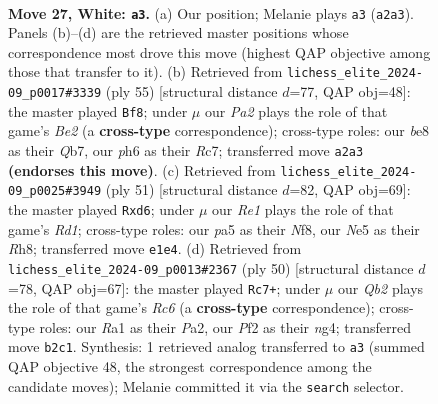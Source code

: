 \documentclass[11pt]{article}
\begin{document}
\clearpage

\begin{figure}[p]\centering
\begin{subfigure}{0.46\textwidth}\centering
\resizebox{\linewidth}{!}{%
\newchessgame
\chessboard[
  setfen={r2qb1k1/p4pp1/7p/p2pN1P1/1r2n2P/1P1B4/PQ3P2/R3R1K1 w - - 1 27},
  showmover=false,
  pgfstyle=straightmove, color=movearrow, markmove={a2-a3}
]}
\caption{}
\end{subfigure}\hfill
\begin{subfigure}{0.46\textwidth}\centering
\resizebox{\linewidth}{!}{%
\newchessgame
\chessboard[
  setfen={2r3k1/1qr1b1p1/p2p2R1/1p2p2p/3BP2P/1P3P1R/P1P3Q1/1K6 b - - 1 28},
  showmover=false,
  pgfstyle=straightmove, color=movearrow, markmove={e7-f8}
]}
\caption{}
\end{subfigure}
\\[4pt]
\begin{subfigure}{0.46\textwidth}\centering
\resizebox{\linewidth}{!}{%
\newchessgame
\chessboard[
  setfen={1k1r1n1r/1p2qp2/2bNp1p1/4P1P1/1PpP1R1P/P3B3/8/R2QK3 b Q - 4 26},
  showmover=false,
  pgfstyle=straightmove, color=movearrow, markmove={d8-d6}
]}
\caption{}
\end{subfigure}\hfill
\begin{subfigure}{0.46\textwidth}\centering
\resizebox{\linewidth}{!}{%
\newchessgame
\chessboard[
  setfen={3r3r/6k1/p1RPq1p1/3Np2p/5pnP/6P1/PP1Q1P2/3R2K1 w - - 2 26},
  showmover=false,
  pgfstyle=straightmove, color=movearrow, markmove={c6-c7}
]}
\caption{}
\end{subfigure}
\caption{\textbf{Move 27, White: \texttt{a3}.} (a) Our position; Melanie plays \texttt{a3} (\texttt{a2a3}). Panels (b)--(d) are the retrieved master positions whose correspondence most drove this move (highest QAP objective among those that transfer to it). (b) Retrieved from \texttt{lichess\_elite\_2024-09\_p0017\#3339} (ply 55) [structural distance $d$=77, QAP obj=48]: the master played \texttt{Bf8}; under $\mu$ our \emph{Pa2} plays the role of that game's \emph{Be2} (a \textbf{cross-type} correspondence); cross-type roles: our \emph{b}e8 as their \emph{Q}b7, our \emph{p}h6 as their \emph{R}c7; transferred move \texttt{a2a3} \textbf{(endorses this move)}. (c) Retrieved from \texttt{lichess\_elite\_2024-09\_p0025\#3949} (ply 51) [structural distance $d$=82, QAP obj=69]: the master played \texttt{Rxd6}; under $\mu$ our \emph{Re1} plays the role of that game's \emph{Rd1}; cross-type roles: our \emph{p}a5 as their \emph{N}f8, our \emph{N}e5 as their \emph{R}h8; transferred move \texttt{e1e4}. (d) Retrieved from \texttt{lichess\_elite\_2024-09\_p0013\#2367} (ply 50) [structural distance $d$=78, QAP obj=67]: the master played \texttt{Rc7+}; under $\mu$ our \emph{Qb2} plays the role of that game's \emph{Rc6} (a \textbf{cross-type} correspondence); cross-type roles: our \emph{R}a1 as their \emph{P}a2, our \emph{P}f2 as their \emph{n}g4; transferred move \texttt{b2c1}. Synthesis: 1 retrieved analog transferred to \texttt{a3} (summed QAP objective 48, the strongest correspondence among the candidate moves); Melanie committed it via the \texttt{search} selector.}
\label{fig:thought-m52}
\end{figure}
\end{document}
